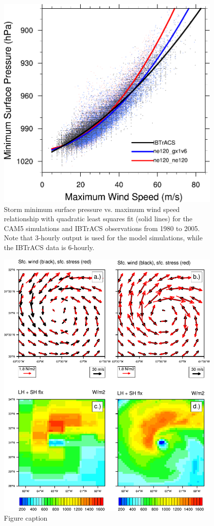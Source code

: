 \documentclass[draft,ms]{AGUTeX}
\begin{document}
\begin{figure}
\includegraphics[width=0.8\linewidth]{fig_preswind.pdf}
\caption{Storm minimum surface pressure vs. maximum wind speed relationship with quadratic least squares fit (solid lines) for the CAM5 simulations and IBTrACS observations from 1980 to 2005.  Note that 3-hourly output is used for the model simulations, while the IBTrACS data is 6-hourly.}
\label{fig:preswind}
\end{figure}

\begin{figure}
\includegraphics[width=0.8\linewidth]{fig_compareStress.pdf}
\caption{Figure caption}
\label{fig:forecast_panels}
\end{figure}
\end{document}
